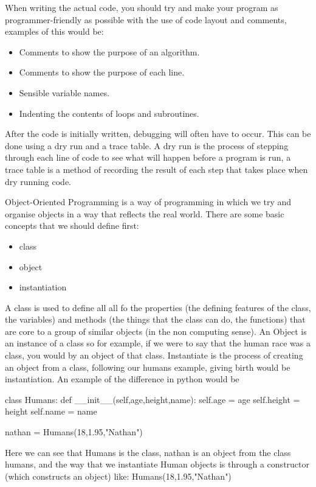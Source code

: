   When writing the actual code, you should try and make your program as programmer-friendly  as possible with the use of code layout and comments, examples of this would be:
  \begin{itemize}
    \setlength\itemsep{0cm}
    \item Comments to show the purpose of an algorithm.
    \item Comments to show the purpose of each line.
    \item Sensible variable names.
    \item Indenting the contents of loops and subroutines.
  \end{itemize}
  After the code is initially written, debugging will often have to occur. This can be done using a dry run and a trace table. A dry run is the process of stepping through each line of code to see what will happen before a program is run, a trace table is a method of recording the result of each step that takes place when dry running code.
  
  \noindent
  Object-Oriented Programming is a way of programming in which we try and organise objects in a way that reflects the real world. There are some basic concepts that we should define first:
  \begin{itemize}
  	\item class
  	\item object
  	\item instantiation
  \end{itemize}
  A class is used to define all all fo the properties (the defining features of the class, the variables) and methods (the things that the class can do, the functions) that are core to a group of similar objects (in the non computing sense). An Object is an instance of a class so for example, if we were to say that the human race was a class, you would by an object of that class. Instantiate is the process of creating an object from a class, following our humans example, giving birth would be instantiation. An example of the difference in python would be
  \begin{python}
class Humans:
	def __init__(self,age,height,name):
		self.age = age
		self.height = height
		self.name = name

nathan = Humans(18,1.95,"Nathan")\end{python}
  Here we can see that Humans is the class, nathan is an object from the class humans, and the way that we instantiate Human objects is through a constructor (which constructs an object) like: Humans(18,1.95,"Nathan")
  
